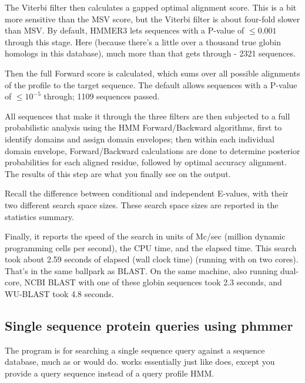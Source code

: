 The Viterbi filter then calculates a gapped optimal alignment score.
This is a bit more sensitive than the MSV score, but the Viterbi
filter is about four-fold slower than MSV. By default, HMMER3 lets
sequences with a P-value of $\leq 0.001$ through this stage. Here
(because there's a little over a thousand true globin homologs in this
database), much more than that gets through - 2321 sequences.

Then the full Forward score is calculated, which sums over all
possible alignments of the profile to the target sequence. The default
allows sequences with a P-value of $\leq 10^{-5}$ through; 1109
sequences passed.

All sequences that make it through the three filters are then
subjected to a full probabilistic analysis using the HMM
Forward/Backward algorithms, first to identify domains and assign
domain envelopes; then within each individual domain envelope,
Forward/Backward calculations are done to determine posterior
probabilities for each aligned residue, followed by optimal accuracy
alignment. The results of this step are what you finally see on the
output.

Recall the difference between conditional and independent E-values,
with their two different search space sizes. These search space sizes
are reported in the statistics summary.

Finally, it reports the speed of the search in units of Mc/sec
(million dynamic programming cells per second), the CPU time, and the
elapsed time. This search took about 2.59 seconds of elapsed (wall
clock time) (running with  on two cores). That's in the
same ballpark as BLAST. On
the same machine, also running dual-core, NCBI BLAST with one of these
globin sequences took 2.3 seconds, and WU-BLAST took 4.8 seconds.


\subsection{Single sequence protein queries using phmmer}

The  program is for searching a single sequence query
against a sequence database, much as  or 
would do.  works essentially just like 
does, except you provide a query sequence instead of a query profile
HMM. 

